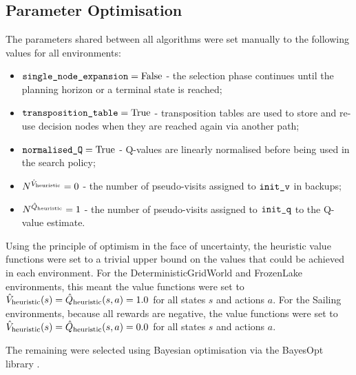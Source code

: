 \subsection{Parameter Optimisation}
\label{appsec:4:hypersearch}

    The parameters shared between all algorithms were set manually to the following values for all environments:
    \begin{itemize}
        \item ${\textnormal{\texttt{single\_node\_expansion}}}=\text{False}$ - the selection phase continues until the planning horizon or a terminal state is reached;
        \item ${\textnormal{\texttt{transposition\_table}}}=\text{True}$ - transposition tables are used to store and re-use decision nodes when they are reached again via another path;
        \item ${\textnormal{\texttt{normalised\_Q}}}=\text{True}$ - Q-values are linearly normalised before being used in the search policy;
        \item $N^{{\hat{V}_{\textnormal{heuristic}}}}=0$ - the number of pseudo-visits assigned to ${\textnormal{\texttt{init\_v}}}$ in backups;
        \item $N^{{\hat{Q}_{\textnormal{heuristic}}}}=1$ - the number of pseudo-visits assigned to ${\textnormal{\texttt{init\_q}}}$  to the Q-value estimate.
    \end{itemize}

    Using the principle of optimism in the face of uncertainty, the heuristic value functions were set to a trivial upper bound on the values that could be achieved in each environment. For the DeterministicGridWorld and FrozenLake environments, this meant the value functions were set to ${\hat{V}_{\textnormal{heuristic}}}(s)={\hat{Q}_{\textnormal{heuristic}}}(s,a)=1.0$ for all states $s$ and actions $a$. For the Sailing environments, because all rewards are negative, the value functions were set to ${\hat{V}_{\textnormal{heuristic}}}(s)={\hat{Q}_{\textnormal{heuristic}}}(s,a)=0.0$ for all states $s$ and actions $a$. 
    
    The remaining  were selected using Bayesian optimisation via the BayesOpt library \cite{bayesopt}. 


